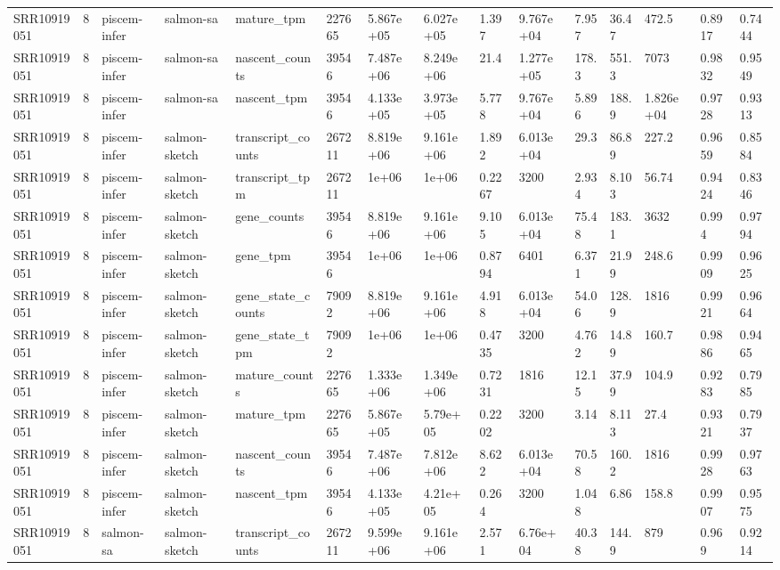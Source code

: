 \begin{tabular}{lllllllllllllll}
SRR10919051 & 8 & piscem-infer & salmon-sa & mature\_tpm & 227665 & 5.867e+05 & 6.027e+05 & 1.397 & 9.767e+04 & 7.957 & 36.47 & 472.5 & 0.8917 & 0.7444 \\
SRR10919051 & 8 & piscem-infer & salmon-sa & nascent\_counts & 39546 & 7.487e+06 & 8.249e+06 & 21.4 & 1.277e+05 & 178.3 & 551.3 & 7073 & 0.9832 & 0.9549 \\
SRR10919051 & 8 & piscem-infer & salmon-sa & nascent\_tpm & 39546 & 4.133e+05 & 3.973e+05 & 5.778 & 9.767e+04 & 5.896 & 188.9 & 1.826e+04 & 0.9728 & 0.9313 \\
SRR10919051 & 8 & piscem-infer & salmon-sketch & transcript\_counts & 267211 & 8.819e+06 & 9.161e+06 & 1.892 & 6.013e+04 & 29.3 & 86.89 & 227.2 & 0.9659 & 0.8584 \\
SRR10919051 & 8 & piscem-infer & salmon-sketch & transcript\_tpm & 267211 & 1e+06 & 1e+06 & 0.2267 & 3200 & 2.934 & 8.103 & 56.74 & 0.9424 & 0.8346 \\
SRR10919051 & 8 & piscem-infer & salmon-sketch & gene\_counts & 39546 & 8.819e+06 & 9.161e+06 & 9.105 & 6.013e+04 & 75.48 & 183.1 & 3632 & 0.994 & 0.9794 \\
SRR10919051 & 8 & piscem-infer & salmon-sketch & gene\_tpm & 39546 & 1e+06 & 1e+06 & 0.8794 & 6401 & 6.371 & 21.99 & 248.6 & 0.9909 & 0.9625 \\
SRR10919051 & 8 & piscem-infer & salmon-sketch & gene\_state\_counts & 79092 & 8.819e+06 & 9.161e+06 & 4.918 & 6.013e+04 & 54.06 & 128.9 & 1816 & 0.9921 & 0.9664 \\
SRR10919051 & 8 & piscem-infer & salmon-sketch & gene\_state\_tpm & 79092 & 1e+06 & 1e+06 & 0.4735 & 3200 & 4.762 & 14.89 & 160.7 & 0.9886 & 0.9465 \\
SRR10919051 & 8 & piscem-infer & salmon-sketch & mature\_counts & 227665 & 1.333e+06 & 1.349e+06 & 0.7231 & 1816 & 12.15 & 37.99 & 104.9 & 0.9283 & 0.7985 \\
SRR10919051 & 8 & piscem-infer & salmon-sketch & mature\_tpm & 227665 & 5.867e+05 & 5.79e+05 & 0.2202 & 3200 & 3.14 & 8.113 & 27.4 & 0.9321 & 0.7937 \\
SRR10919051 & 8 & piscem-infer & salmon-sketch & nascent\_counts & 39546 & 7.487e+06 & 7.812e+06 & 8.622 & 6.013e+04 & 70.58 & 160.2 & 1816 & 0.9928 & 0.9763 \\
SRR10919051 & 8 & piscem-infer & salmon-sketch & nascent\_tpm & 39546 & 4.133e+05 & 4.21e+05 & 0.264 & 3200 & 1.048 & 6.86 & 158.8 & 0.9907 & 0.9575 \\
SRR10919051 & 8 & salmon-sa & salmon-sketch & transcript\_counts & 267211 & 9.599e+06 & 9.161e+06 & 2.571 & 6.76e+04 & 40.38 & 144.9 & 879 & 0.969 & 0.9214 \\

\end{tabular}
